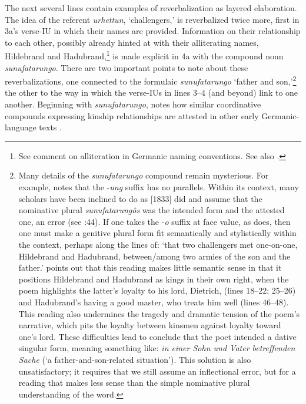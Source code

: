 The next several lines contain examples of reverbalization as layered elaboration. The idea of the referent \textit{urhettun}, ‘challengers,’ is reverbalized twice more, first in 3a’s verse-IU in which their names are provided. Information on their relationship to each other, possibly already hinted at with their alliterating names, Hildebrand and Hadubrand,\footnote{{See  comment on alliteration in Germanic naming conventions. See also \citet[24]{Woolf1937}.} } is made explicit in 4a with the compound noun \textit{sunufatarungo}. There are two important points to note about these reverbalizations, one connected to the formulaic \textit{sunufatarungo} ‘father and son,’\footnote{{Many details of the \textit{sunufatarungo} compound remain mysterious. For example, \citet[65--66]{Schürr2013} notes that the -\textit{ung} suffix has no parallels. Within its context, many scholars have been inclined to do as \citet[418]{Lachmann1876} [1833] did and assume that the nominative plural \textit{sunufatarungôs} was the intended form and the attested one, an error (see \citealt{Bostock1976}:44). If one takes the -\textit{o} suffix at face value, as \citet[149]{Haubrichs1988} does, then one must make a genitive plural form fit semantically and stylistically within the context, perhaps along the lines of: ‘that two challengers met one-on-one, Hildebrand and Hadubrand, between\slash among two armies of the son and the father.’ \citet[66]{Schürr2013} points out that this reading makes little semantic sense in that it positions Hildebrand and Hadubrand as kings in their own right, when the poem highlights the latter’s loyalty to his lord, Dietrich, (lines 18--22; 25--26) and Hadubrand’s having a good master, who treats him well (lines 46--48). This reading also undermines the tragedy and dramatic tension of the poem’s narrative, which pits the loyalty between kinsmen against loyalty toward one’s lord. These difficulties lead \citet[28]{Schützeichel1981} to conclude that the poet intended a dative singular form, meaning something like: \textit{in einer Sohn und Vater betreffenden Sache} (‘a father-and-son-related situation’). This solution is also unsatisfactory; it requires that we still assume an inflectional error, but for a reading that makes less sense than the simple nominative plural understanding of the word.} } the other to the way in which the verse-IUs in lines 3--4 (and beyond) link to one another. Beginning with \textit{sunufatarungo}, \citet{Schürr2013} notes how similar coordinative compounds expressing kinship relationships are attested in other early Germanic-language texts .

